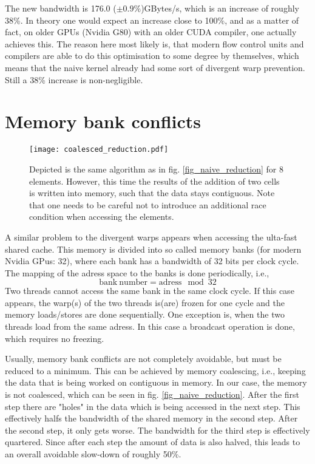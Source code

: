 The new bandwidth is 176.0 (\( \pm 0.9\% \))GBytes/s, which is an increase of roughly 38\%.
In theory one would expect an increase close to 100\%, and as a matter of fact, on older GPUs (Nvidia G80) with an older CUDA compiler, one actually achieves this.
The reason here most likely is, that modern flow control units and compilers are able to do this optimisation to some degree by themselves, which means that the naive kernel already had some sort of divergent warp prevention.
Still a 38\% increase is non-negligible.

\section{Memory bank conflicts}

\begin{figure} \label{fig_coalesced_reduction}
    \centering
    \texttt{[image: coalesced\_reduction.pdf]}
    \caption{
        Depicted is the same algorithm as in fig. \ref{fig_naive_reduction} for 8 elements.
        However, this time the results of the addition of two cells is written into memory, such that the data stays contiguous.
        Note that one needs to be careful not to introduce an additional race condition when accessing the elements.
    }
\end{figure}

A similar problem to the divergent warps appears when accessing the ulta-fast shared cache.
This memory is divided into so called memory banks (for modern Nvidia GPus: 32), where each bank has a bandwidth of 32 bits per clock cycle.
The mapping of the adress space to the banks is done periodically, i.e., 
\begin{equation}
\mathrm{bank\ number} = \mathrm{adress} \mod 32
\end{equation}
Two threads cannot access the same bank in the same clock cycle.
If this case appears, the warp(s) of the two threads is(are) frozen for one cycle and the memory loads/stores are done sequentially.
One exception is, when the two threads load from the same adress.
In this case a broadcast operation is done, which requires no freezing.

Usually, memory bank conflicts are not completely avoidable, but must be reduced to a minimum.
This can be achieved by memory coalescing, i.e., keeping the data that is being worked on contiguous in memory.
In our case, the memory is not coalesced, which can be seen in fig. \ref{fig_naive_reduction}.
After the first step there are "holes" in the data which is being accessed in the next step.
This effectively halfs the bandwidth of the shared memory in the second step.
After the second step, it only gets worse.
The bandwidth for the third step is effectively quartered.
Since after each step the amount of data is also halved, this leads to an overall avoidable slow-down of roughly 50\%.

